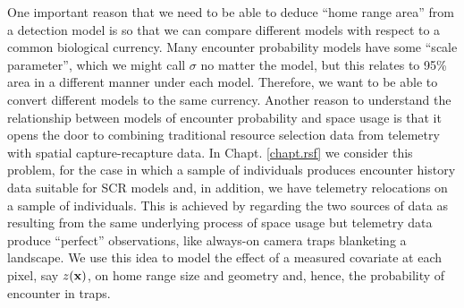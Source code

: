 One important reason that we need to be able to deduce ``home range
area'' from a detection model is so that we can compare different
models with respect to a common biological currency.
Many encounter probability models have some ``scale parameter'', which
we might call $\sigma$ no matter the model, but this
relates to 95\% area in a different manner under each model.
Therefore, we want to be able to convert different models to the
same currency.
Another reason to understand the relationship between models of
encounter probability and space usage is that it opens the door to
combining traditional resource selection data from telemetry with
spatial capture-recapture data.  In Chapt. \ref{chapt.rsf} we consider
this problem, for the case in which a sample of individuals produces
encounter history data suitable for SCR models and, in addition, we
have telemetry relocations on a sample of individuals. This is
achieved by regarding the two sources of data as resulting from the
same underlying process of space usage but telemetry data produce
``perfect'' observations, like always-on camera traps blanketing a
landscape.  We use this idea to model the effect of a measured
covariate at each pixel, say $z({\bf x})$, on home range size and geometry
and, hence, the probability of encounter in traps.

